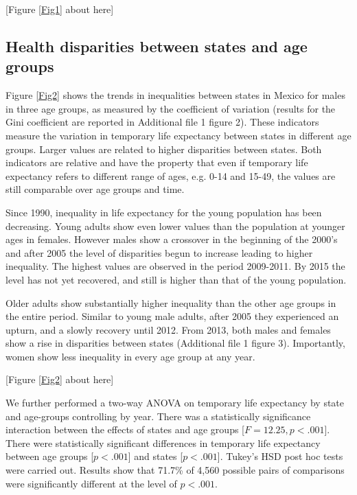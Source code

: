 \documentclass{bmcart}
\begin{document}
\begin{center}
[Figure \ref{Fig1} about here]
\end{center}

\subsection*{Health disparities between states and age groups}
Figure \ref{Fig2} shows the trends in inequalities between states in Mexico for males in three age groups, as measured by the coefficient of variation (results for the Gini coefficient are reported in Additional file 1 figure 2). These indicators measure the variation in temporary life expectancy between states in different age groups. Larger values are related to higher disparities between states. Both indicators are relative and have the property that even if temporary life expectancy refers to different range of ages, e.g. 0-14 and 15-49, the values are still comparable over age groups and time. 

Since 1990, inequality in life expectancy for the young population has been decreasing. Young adults show even lower values than the population at younger ages in females. However males show a crossover in the beginning of the 2000's and after 2005 the level of disparities begun to increase leading to higher inequality. The highest values are observed in the period 2009-2011. By 2015 the level has not yet recovered, and still is higher than that of the young population.

Older adults show substantially higher inequality than the other age groups in the entire period. Similar to young male adults, after 2005 they experienced an upturn, and a slowly recovery until 2012. From 2013, both males and females show a rise in disparities between states (Additional file 1 figure 3). Importantly, women show less inequality in every age group at any year. \\

\begin{center}
[Figure \ref{Fig2} about here]
\end{center}


We further performed a two-way ANOVA on temporary life expectancy by state and age-groups controlling by year. There was a statistically significance interaction between the effects of states and age groups [$F=12.25, p < .001$]. There were statistically significant differences in temporary life expectancy between age groups [$p < .001$] and states [$p < .001$]. Tukey's HSD post hoc tests were carried out. Results show that 71.7\% of 4,560 possible pairs of comparisons were significantly different at the level of $p < .001$. 
\end{document}
